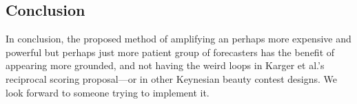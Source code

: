 \documentclass[]{article}
\begin{document}
\hypertarget{conclusion}{%
\subsection{Conclusion}\label{conclusion}}

In conclusion, the proposed method of amplifying an perhaps more
expensive and powerful but perhaps just more patient group of
forecasters has the benefit of appearing more grounded, and not having
the weird loops in Karger et al.'s reciprocal scoring proposal---or in
other Keynesian beauty contest designs. We look forward to someone
trying to implement it.
\end{document}
